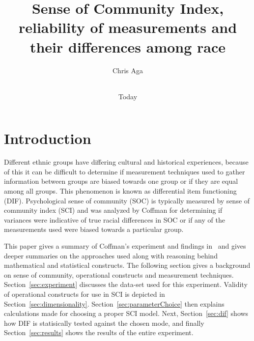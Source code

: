 \documentclass{sig-alternate}
\begin{document}
\title{Sense of Community Index, reliability of measurements and their differences among race}
\author{
\alignauthor
Chris Aga \\
 \\
}

\date{Today}

\maketitle




\section{Introduction}
Different ethnic groups have differing cultural and historical experiences, because of this it can be difficult to determine if measurement techniques used to gather information between groups are biased towards one group or if they are equal among all groups. This phenomenon is known as differential item functioning (DIF). Psychological sense of community (SOC) is typically measured by sense of community index (SCI) and was analyzed by Coffman for determining if variances were indicative of true racial differences in SOC or if any of the measurements used were biased towards a particular group.

This paper gives a summary of Coffman's experiment and findings in~\cite{disparities:2009} and gives deeper summaries on the approaches used along with reasoning behind mathematical and statistical constructs. The following section gives a background on sense of community, operational constructs and measurement techniques. Section~\ref{sec:experiment} discusses the data-set used for this experiment. Validity of operational constructs for use in SCI is depicted in Section~\ref{sec:dimensionality}. Section~\ref{sec:parameterChoice} then explains calculations made for choosing a proper SCI model. Next, Section~\ref{sec:dif} shows how DIF is statisically tested against the chosen mode, and finally Section~\ref{sec:results} shows the results of the entire experiment.
\end{document}
